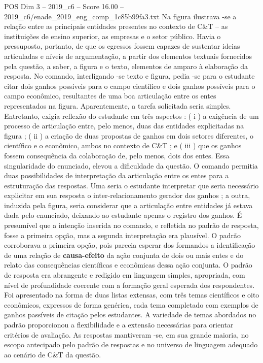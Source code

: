 \begin{textsample}{POS Dim 3 – 2019\_c6 – Score 16.00 – 2019\_c6/enade\_2019\_eng\_comp\_1c85b99fa3.txt}
Na figura ilustrava -se a relação entre as principais entidades presentes no contexto de C\&T – as instituições de ensino superior, as empresas e o setor público.
Havia o pressuposto, portanto, de que os egressos fossem capazes de sustentar ideias articuladas e níveis de argumentação, a partir dos elementos textuais fornecidos pela questão, a saber, a figura e o texto, elementos de amparo à elaboração da resposta.
No comando, interligando -se texto e figura, pedia -se para o estudante citar dois ganhos possíveis para o campo científico e dois ganhos possíveis para o campo econômico, resultantes de uma boa articulação entre os entes representados na figura.
Aparentemente, a tarefa solicitada seria simples.
Entretanto, exigia reflexão do estudante em três aspectos : ( i ) a exigência de um processo de articulação entre, pelo menos, duas das entidades explicitadas na figura ; ( ii ) a criação de duas propostas de ganhos em dois setores diferentes, o científico e o econômico, ambos no contexto de C\&T ; e ( iii ) que os ganhos fossem consequência da colaboração de, pelo menos, dois dos entes.
Essa singularidade do enunciado, elevou a dificuldade da questão.
O comando permitia duas possibilidades de interpretação da articulação entre os entes para a estruturação das respostas.
Uma seria o estudante interpretar que seria necessário explicitar em sua resposta o inter-relacionamento gerador dos ganhos ; a outra, induzida pela figura, seria considerar que a articulação entre entidades já estava dada pelo enunciado, deixando ao estudante apenas o registro dos ganhos.
É presumível que a intenção inserida no comando, e refletida no padrão de resposta, fosse a primeira opção, mas a segunda interpretação era plausível.
O padrão corroborava a primeira opção, pois parecia esperar dos formandos a identificação de uma relação de \textbf{causa-efeito} da ação conjunta de dois ou mais entes e do relato das consequências científicas e econômicas dessa ação conjunta.
O padrão de resposta era abrangente e redigido em linguagem simples, apropriada, com nível de profundidade coerente com a formação geral esperada dos respondentes.
Foi apresentado na forma de duas listas extensas, com três temas científicos e oito econômicos, expressos de forma genérica, cada tema completado com exemplos de ganhos passíveis de citação pelos estudantes.
A variedade de temas abordados no padrão proporcionou a flexibilidade e a extensão necessárias para orientar critérios de avaliação.
As respostas mantiveram -se, em sua grande maioria, no escopo antecipado pelo padrão de respostas e no universo de linguagem adequado ao cenário de C\&T da questão.

\end{textsample}
